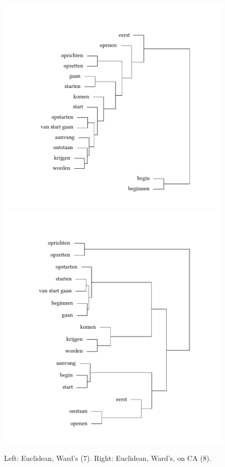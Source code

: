 \begin{figure}
\includegraphics[width=.48\textwidth,trim=95 40 75 105]{figures/tree36.pdf}\hfill%
\includegraphics[width=.48\textwidth,trim=95 40 75 105]{figures/tree37.pdf}
\caption{\label{fig:3:36}Left: Euclidean, Ward’s (7). Right:\label{fig:3:37} Euclidean, Ward’s, on CA (8).}
\end{figure}

